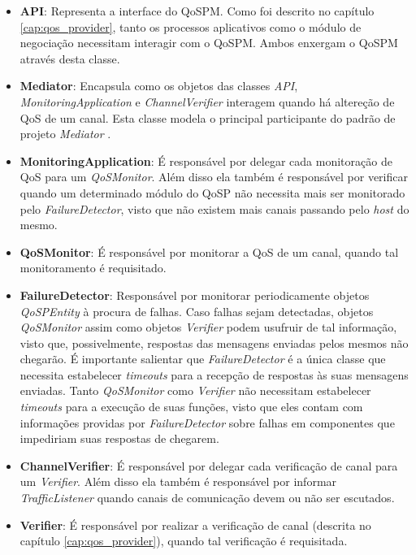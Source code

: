 \begin{itemize}
\item \textbf{API}: Representa a interface do QoSPM. Como foi descrito no capítulo \ref{cap:qos_provider}, tanto os processos aplicativos como o módulo de negociação necessitam interagir com o QoSPM. Ambos enxergam o QoSPM através desta classe.

\item \textbf{Mediator}: Encapsula como os objetos das classes \textit{API}, \textit{MonitoringApplication} e \textit{ChannelVerifier} interagem quando há altereção de QoS de um canal. Esta classe modela o principal participante do padrão de projeto \textit{Mediator} \cite{GAHEJOVLI97}.

\item \textbf{MonitoringApplication}: É responsável por delegar cada monitoração de QoS para um \textit{QoSMonitor}. Além disso ela também é responsável por verificar quando um determinado módulo do QoSP não necessita mais ser monitorado pelo \textit{FailureDetector}, visto que não existem mais canais passando pelo \textit{host} do mesmo.

\item \textbf{QoSMonitor}: É responsável por monitorar a QoS de um canal, quando tal monitoramento é requisitado.

\item \textbf{FailureDetector}: Responsável por monitorar periodicamente objetos \textit{QoSPEntity} à procura de falhas. Caso falhas sejam detectadas, objetos \textit{QoSMonitor} assim como objetos \textit{Verifier} podem usufruir de tal informação, visto que, possivelmente, respostas das mensagens enviadas pelos mesmos não chegarão. É importante salientar que \textit{FailureDetector} é a única classe que necessita estabelecer \textit{timeouts} para a recepção de respostas às suas mensagens enviadas. Tanto \textit{QoSMonitor} como \textit{Verifier} não necessitam estabelecer \textit{timeouts} para a execução de suas funções, visto que eles contam com informações providas por \textit{FailureDetector} sobre falhas em componentes que impediriam suas respostas de chegarem.

\item \textbf{ChannelVerifier}: É responsável por delegar cada verificação de canal para um \textit{Verifier}. Além disso ela também é responsável por informar \textit{TrafficListener} quando canais de comunicação devem ou não ser escutados.

\item \textbf{Verifier}: É responsável por realizar a verificação de canal (descrita no capítulo \ref{cap:qos_provider}), quando tal verificação é requisitada.


\end{itemize}
